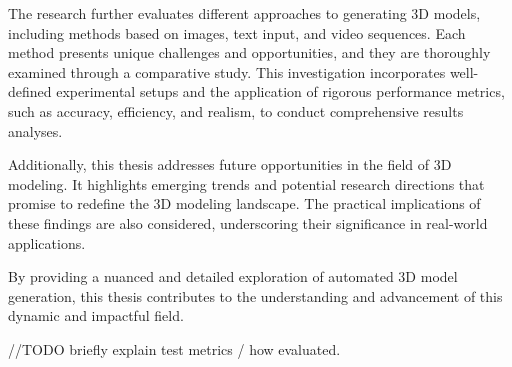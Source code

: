 The research further evaluates different approaches to generating 3D models, including methods based on images, text input, and video sequences. Each method presents unique challenges and opportunities, and they are thoroughly examined through a comparative study. This investigation incorporates well-defined experimental setups and the application of rigorous performance metrics, such as accuracy, efficiency, and realism, to conduct comprehensive results analyses.

Additionally, this thesis addresses future opportunities in the field of 3D modeling. It highlights emerging trends and potential research directions that promise to redefine the 3D modeling landscape. The practical implications of these findings are also considered, underscoring their significance in real-world applications.

By providing a nuanced and detailed exploration of automated 3D model generation, this thesis contributes to the understanding and advancement of this dynamic and impactful field.

//TODO briefly explain test metrics / how evaluated.